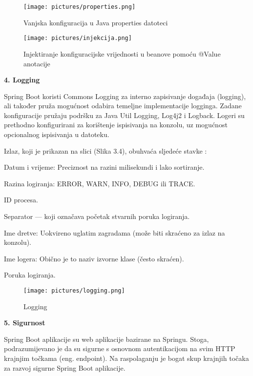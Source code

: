\documentclass[times, utf8, zavrsni]{fer}
\begin{document}
\begin{figure}[h]
			\texttt{[image: pictures/properties.png]} %
		\centering
			\caption{ Vanjska konfiguracija u Java properties datoteci}
			\label{fig:promjene}
\end{figure}

\begin{figure}[h]
			\texttt{[image: pictures/injekcija.png]} %
		\centering
			\caption{ Injektiranje konfiguracijske vrijednosti u beanove pomoću @Value anotacije}
			\label{fig:promjene}
\end{figure}
 
\textbf{4. Logging} 

Spring Boot koristi Commons Logging za interno zapisivanje događaja (logging), ali također pruža mogućnost odabira temeljne implementacije logginga. Zadane konfiguracije pružaju podršku za Java Util Logging, Log4j2 i Logback. Logeri su prethodno konfigurirani za korištenje ispisivanja na konzolu, uz mogućnost opcionalnog ispisivanja u datoteku.

Izlaz, koji je prikazan na slici (Slika 3.4), obuhvaća sljedeće stavke :

Datum i vrijeme: Preciznost na razini milisekundi i lako sortiranje.

Razina logiranja: ERROR, WARN, INFO, DEBUG ili TRACE.

ID procesa.

Separator --- koji označava početak stvarnih poruka logiranja.

Ime dretve: Uokvireno uglatim zagradama (može biti skraćeno za izlaz na konzolu).

Ime logera: Obično je to naziv izvorne klase (često skraćen).

Poruka logiranja.
\begin{figure}[h]
			\texttt{[image: pictures/logging.png]} %
		\centering
			\caption{ Logging }
			\label{fig:promjene}
\end{figure}
\vspace{\baselineskip}

  \textbf{5. Sigurnost }
  
Spring Boot aplikacije su web aplikacije bazirane na Springu. Stoga, podrazumijevano je da su sigurne s osnovnom autentikacijom na svim HTTP krajnjim točkama (eng. endpoint). Na raspolaganju je bogat skup krajnjih točaka za razvoj sigurne Spring Boot aplikacije.
\end{document}
